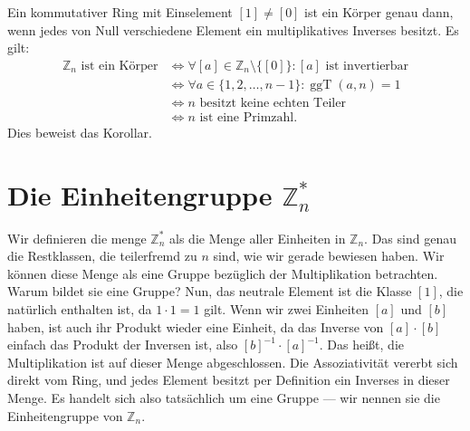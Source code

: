 \begin{math-stroke}

\begin{short-proof}
Ein kommutativer Ring mit Einselement $[1] \neq [0]$ ist ein Körper genau dann, wenn jedes von Null verschiedene Element ein multiplikatives Inverses besitzt. Es gilt:
\begin{align*}
\mathbb{Z}_n \text{ ist ein Körper} &\iff \forall [a] \in \mathbb{Z}_n \setminus \{[0]\} \colon [a] \text{ ist invertierbar} \\
&\iff \forall a \in \{1, 2, \dots, n-1\} \colon \operatorname{ggT}(a, n) = 1 \\
&\iff n \text{ besitzt keine echten Teiler} \\
&\iff n \text{ ist eine Primzahl}.
\end{align*}
Dies beweist das Korollar.
\end{short-proof}
\end{math-stroke}

\section{Die Einheitengruppe \texorpdfstring{$\mathbb{Z}_n^*$}{Zn*}}

\begin{spoken-clean}[00:33:13 - 00:36:01]
Wir definieren die menge $\mathbb{Z}_n^*$ als die Menge aller Einheiten in $\mathbb{Z}_n$. Das sind genau die Restklassen, die teilerfremd zu $n$ sind, wie wir gerade bewiesen haben. Wir können diese Menge als eine Gruppe bezüglich der Multiplikation betrachten. Warum bildet sie eine Gruppe? Nun, das neutrale Element ist die Klasse $[1]$, die natürlich enthalten ist, da $1 \cdot 1 = 1$ gilt. Wenn wir zwei Einheiten $[a]$ und $[b]$ haben, ist auch ihr Produkt wieder eine Einheit, da das Inverse von $[a] \cdot [b]$ einfach das Produkt der Inversen ist, also $[b]^{-1} \cdot [a]^{-1}$. Das heißt, die Multiplikation ist auf dieser Menge abgeschlossen. Die Assoziativität vererbt sich direkt vom Ring, und jedes Element besitzt per Definition ein Inverses in dieser Menge. Es handelt sich also tatsächlich um eine Gruppe --- wir nennen sie die Einheitengruppe von $\mathbb{Z}_n$.
\end{spoken-clean}

